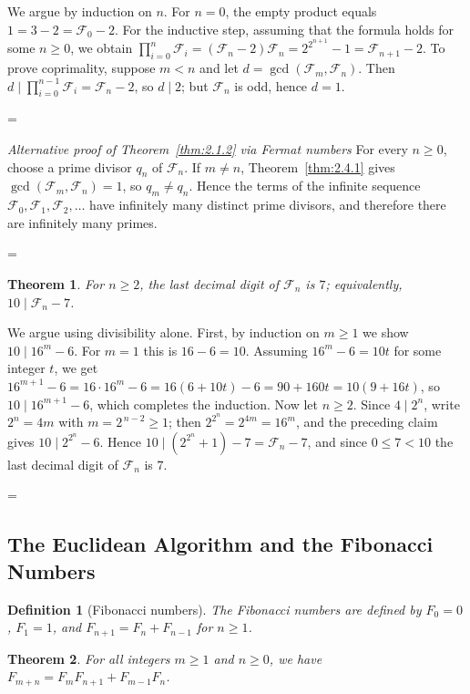 \documentclass[11pt]{article}
\makeatletter
\theoremstyle{ntstyle}
\newtheorem{theorem}{Theorem}[subsection]
\newtheorem{definition}{Definition}[subsection]
\let\nt@closedisplay\]
\def\nt@guardedclose{\@ifnextchar\par{\nt@closeafterpar}{\@ifnextchar\end{\postdisplaypenalty\@M\nt@closedisplay}{\nt@closedisplay}}}
\def\nt@closeafterpar\par{\@ifnextchar\par{\nt@closeafterpar}{\@ifnextchar\end{\postdisplaypenalty\@M\nt@closedisplay\par}{\nt@closedisplay\par}}}
\renewenvironment{proof}[1][\proofname]{\par
  \pushQED{\qed}\normalfont\topsep\medskipamount\edef\nt@afterproof{\@endparpenalty=\the\@endparpenalty\relax}\@beginparpenalty\@M\@endparpenalty\@M\let\]\nt@guardedclose\trivlist\item[]\textit{#1\@addpunct{.}} \ignorespaces}{\ifvmode\addpenalty\@M\fi\popQED\nt@afterproof\endtrivlist\@endpefalse}
\newenvironment{altproof}[1][\proofname]{\begin{proof}[#1]\renewcommand{\qedsymbol}{}}{\end{proof}}
\makeatother
\begin{document}
\begin{proof} We argue by induction on $n$. For $n=0$, the empty
	product equals $1 = 3 - 2 = \mathcal{F}_0 - 2$. For the inductive step,
	assuming that the formula holds for some $n\ge0$, we obtain
	$\prod_{i=0}^{n}\mathcal{F}_i = (\mathcal{F}_n-2)\mathcal{F}_n =
			2^{2^{n+1}} - 1 = \mathcal{F}_{n+1}-2$. To prove coprimality, suppose $m<n$ and
	let $d=\gcd(\mathcal{F}_m,\mathcal{F}_n)$. Then $d\mid \prod_{i=0}^{n-1}\mathcal{F}_i = \mathcal{F}_n - 2$, so
	$d\mid 2$; but $\mathcal{F}_n$ is odd, hence $d=1$.

\end{proof}
\begin{altproof}[Alternative proof of Theorem~\ref{thm:2.1.2} via Fermat numbers]
	For every $n\ge0$, choose a prime divisor $q_n$ of $\mathcal{F}_n$.
	If $m\neq n$, Theorem~\ref{thm:2.4.1} gives
	$\gcd(\mathcal{F}_m, \mathcal{F}_n)=1$, so $q_m\neq q_n$. Hence the terms of the
	infinite sequence $\mathcal{F}_0,\mathcal{F}_1,\mathcal{F}_2,\ldots$
	have infinitely many distinct prime divisors, and therefore there are
	infinitely many primes.

\end{altproof}
\begin{theorem}\label{thm:2.4.2} For $n\ge2$, the last
	decimal digit of $\mathcal{F}_n$ is $7$; equivalently, $10\mid
		\mathcal{F}_n-7$.

\end{theorem}

\begin{proof} We argue using divisibility alone. First, by
	induction on $m\ge1$ we show $10\mid 16^{m}-6$. For $m=1$ this is
	$16-6=10$. Assuming $16^{m}-6=10t$ for some integer $t$, we get
	$16^{m+1}-6=16\cdot16^{m}-6=16(6+10t)-6=90+160t=10(9+16t)$, so $10\mid
		16^{m+1}-6$, which completes the induction. Now let $n\ge2$. Since $4\mid
		2^{n}$, write $2^{n}=4m$ with $m=2^{\,n-2}\ge1$; then
	$2^{2^{n}}=2^{4m}=16^{m}$, and the preceding claim gives $10\mid 2^{2^{n}}-6$.
	Hence $10\mid(2^{2^{n}}+1)-7=\mathcal{F}_n-7$, and since $0\le 7<10$ the
	last decimal digit of $\mathcal{F}_n$ is $7$.

\end{proof}
\subsection{The Euclidean Algorithm and the Fibonacci Numbers}

\begin{definition}[Fibonacci numbers]\label{def:2.5.1} The Fibonacci numbers are defined by $F_0 = 0$,
	$F_1 = 1$, and $F_{n+1} = F_n + F_{n-1}$ for $n \ge 1$.

\end{definition}
\begin{theorem}\label{thm:2.5.1} For all integers
	$m \ge 1$ and $n \ge 0$, we have $F_{m+n} = F_m F_{n+1} + F_{m-1} F_n$.

\end{theorem}
\end{document}
